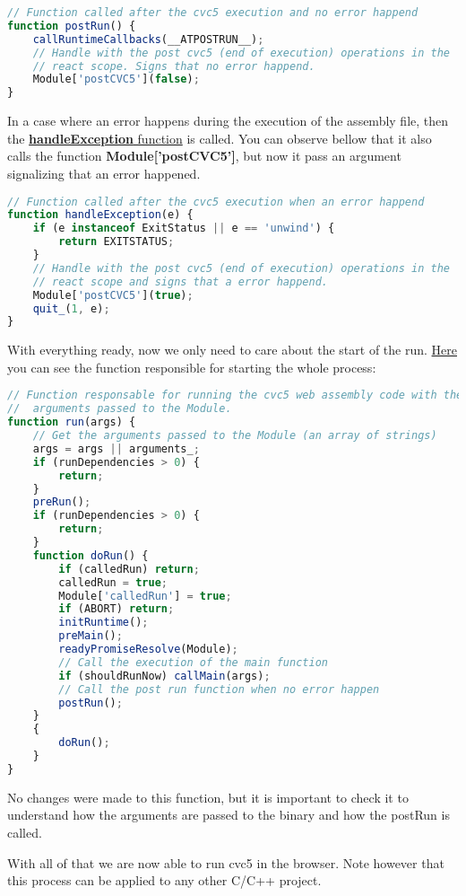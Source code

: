 \documentclass[12pt, a4paper]{article}
\begin{document}
\begin{lstlisting}[language=JavaScript]
// Function called after the cvc5 execution and no error happend
function postRun() {
    callRuntimeCallbacks(__ATPOSTRUN__);
    // Handle with the post cvc5 (end of execution) operations in the
    // react scope. Signs that no error happend.
    Module['postCVC5'](false);
}
\end{lstlisting}

In a case where an error happens during the execution of the assembly file, then
the \href{https://github.com/ufmg-smite/proof-visualizer/blob/main/frontend/src/wasm/cvc5.js#L420-L429 }{\textbf{handleException} function}
is called. You can observe bellow that it also calls the function 
\textbf{Module['postCVC5']}, but now it pass an argument signalizing that an 
error happened.

\begin{lstlisting}[language=JavaScript]
// Function called after the cvc5 execution when an error happend
function handleException(e) {
    if (e instanceof ExitStatus || e == 'unwind') {
        return EXITSTATUS;
    }
    // Handle with the post cvc5 (end of execution) operations in the
    // react scope and signs that a error happend.
    Module['postCVC5'](true);
    quit_(1, e);
}
\end{lstlisting}

With everything ready, now we only need to care about the start of the run. \href{https://github.com/ufmg-smite/proof-visualizer/blob/main/frontend/src/wasm/cvc5.js#L3674-L3702}{Here} you can see the function responsible for starting the whole process:

\begin{lstlisting}[language=JavaScript]
// Function responsable for running the cvc5 web assembly code with the
//  arguments passed to the Module.
function run(args) {
    // Get the arguments passed to the Module (an array of strings)
    args = args || arguments_;
    if (runDependencies > 0) {
        return;
    }
    preRun();
    if (runDependencies > 0) {
        return;
    }
    function doRun() {
        if (calledRun) return;
        calledRun = true;
        Module['calledRun'] = true;
        if (ABORT) return;
        initRuntime();
        preMain();
        readyPromiseResolve(Module);
        // Call the execution of the main function
        if (shouldRunNow) callMain(args);
        // Call the post run function when no error happen
        postRun();
    }
    {
        doRun();
    }
}
\end{lstlisting}

No changes were made to this function, but it is important to check it to understand how the arguments are passed to the binary and how the \textsf{postRun} is called.

With all of that we are now able to run cvc5 in the browser. Note however that
this process can be applied to any other C/C++ project.
\end{document}
